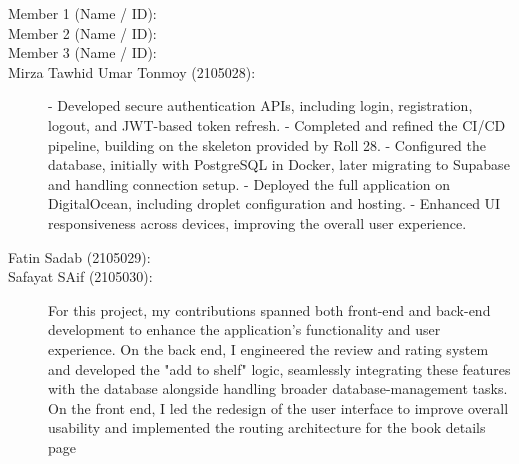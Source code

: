 \documentclass[12pt, a4paper]{report}
\begin{document}
\begin{description}
    \item[Member 1 (Name / ID):] 
    
    \item[Member 2 (Name / ID):] 
    
    \item[Member 3 (Name / ID):] 
    
    \item[Mirza Tawhid Umar Tonmoy (2105028):] 
    - Developed secure authentication APIs, including login, registration, logout, and JWT-based token refresh.  
    - Completed and refined the CI/CD pipeline, building on the skeleton provided by Roll 28.  
    - Configured the database, initially with PostgreSQL in Docker, later migrating to Supabase and handling connection setup.  
    - Deployed the full application on DigitalOcean, including droplet configuration and hosting.  
    - Enhanced UI responsiveness across devices, improving the overall user experience.
    
    \item[Fatin Sadab (2105029):] 
    
    \item[Safayat SAif (2105030):] 
    For this project, my contributions spanned both front-end and back-end development to enhance the application's functionality and user experience. On the back end, I engineered the review and rating system and developed the "add to shelf" logic, seamlessly integrating these features with the database alongside handling broader database-management tasks. On the front end, I led the redesign of the user interface to improve overall usability and implemented the routing architecture for the book details page
\end{description}
\end{document}
